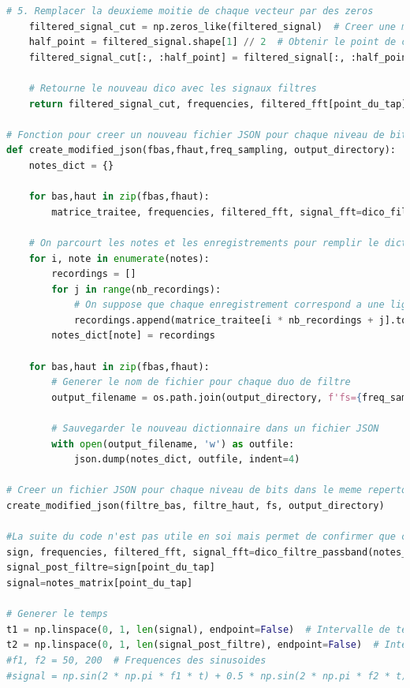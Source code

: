 ﻿\documentclass[11pt,letterpaper]{article}
\begin{document}
\begin{lstlisting}[language=python]
    # 5. Remplacer la deuxieme moitie de chaque vecteur par des zeros
    filtered_signal_cut = np.zeros_like(filtered_signal)  # Creer une matrice du meme type, remplie de zeros
    half_point = filtered_signal.shape[1] // 2  # Obtenir le point de coupure (moitie)
    filtered_signal_cut[:, :half_point] = filtered_signal[:, :half_point]
    
    # Retourne le nouveau dico avec les signaux filtres
    return filtered_signal_cut, frequencies, filtered_fft[point_du_tap], signal_fft[point_du_tap]

# Fonction pour creer un nouveau fichier JSON pour chaque niveau de bits
def create_modified_json(fbas,fhaut,freq_sampling, output_directory):
    notes_dict = {}
    
    for bas,haut in zip(fbas,fhaut):
        matrice_traitee, frequencies, filtered_fft, signal_fft=dico_filtre_passband(notes_matrix,bas,haut)

    # On parcourt les notes et les enregistrements pour remplir le dictionnaire
    for i, note in enumerate(notes):
        recordings = []
        for j in range(nb_recordings):
            # On suppose que chaque enregistrement correspond a une ligne dans notes_matrix
            recordings.append(matrice_traitee[i * nb_recordings + j].tolist())  # Convertir en liste
        notes_dict[note] = recordings

    for bas,haut in zip(fbas,fhaut):
        # Generer le nom de fichier pour chaque duo de filtre
        output_filename = os.path.join(output_directory, f'fs={freq_sampling}-fbas={bas}-fhaut={haut}.json')

        # Sauvegarder le nouveau dictionnaire dans un fichier JSON
        with open(output_filename, 'w') as outfile:
            json.dump(notes_dict, outfile, indent=4)

# Creer un fichier JSON pour chaque niveau de bits dans le meme repertoire que le fichier original
create_modified_json(filtre_bas, filtre_haut, fs, output_directory)

#La suite du code n'est pas utile en soi mais permet de confirmer que ca donne la bonne chose
sign, frequencies, filtered_fft, signal_fft=dico_filtre_passband(notes_matrix,filtre_bas[0],filtre_haut[0])
signal_post_filtre=sign[point_du_tap]
signal=notes_matrix[point_du_tap]

# Generer le temps 
t1 = np.linspace(0, 1, len(signal), endpoint=False)  # Intervalle de temps
t2 = np.linspace(0, 1, len(signal_post_filtre), endpoint=False)  # Intervalle de temps
#f1, f2 = 50, 200  # Frequences des sinusoides
#signal = np.sin(2 * np.pi * f1 * t) + 0.5 * np.sin(2 * np.pi * f2 * t)


\end{lstlisting}
\end{document}
